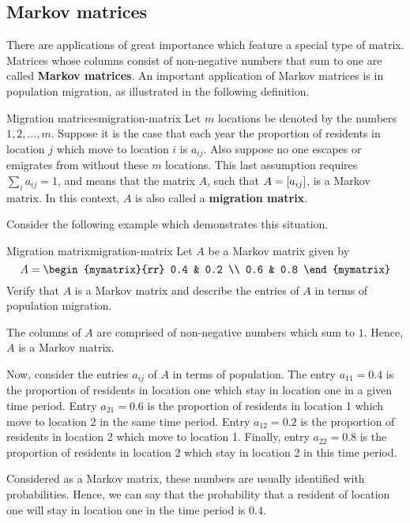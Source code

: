 \subsection{Markov matrices}

There are applications of great importance which feature a special type of matrix.  Matrices whose columns consist of non-negative numbers that sum to one are
called \textbf{Markov matrices}. An important application of Markov matrices is
in population migration, as illustrated in the following definition. 

\begin{definition}{Migration matrices}{migration-matrix}
Let $m$ locations be denoted by the numbers $1,2,\ldots,m$. Suppose
it is the case that each year the proportion of residents in location
$j$ which move to location $i$ is $a_{ij}$. Also suppose no one
escapes or emigrates from without these $m$ locations. This last
assumption requires $\sum_{i}a_{ij}=1$, and means that the matrix $A$,
such that $A = \left[a_{ij} \right]$, is a Markov matrix. In this context,
$A$ is also called a \textbf{migration matrix}.
\end{definition}

Consider the following example which demonstrates this situation.

\begin{example}{Migration matrix}{migration-matrix}
Let $A$ be a Markov matrix given by 
\begin{equation*}
A = 
\begin{mymatrix}{rr}
0.4 & 0.2 \\
0.6 & 0.8
\end{mymatrix}
\end{equation*}
Verify that $A$ is a Markov matrix and describe the entries of $A$ in terms of population migration.
\end{example}

\begin{solution}
The columns of $A$ are comprised of non-negative numbers which sum to $1$. Hence, $A$ is a Markov matrix. 

Now, consider the entries $a_{ij}$ of $A$ in terms of population. The
entry $a_{11} = 0.4$ is the proportion of residents in location one
which stay in location one in a given time period.  Entry $a_{21} =
0.6$ is the proportion of residents in location 1 which move to
location 2 in the same time period. Entry $a_{12} = 0.2$ is the
proportion of residents in location 2 which move to location
1. Finally, entry $a_{22} = 0.8$ is the proportion of residents in
location 2 which stay in location 2 in this time period.  

Considered as a Markov matrix, these numbers are usually identified
with probabilities. Hence, we can say that the probability that a
resident of location one will stay in location one in the time period
is $0.4$.
\end{solution}

